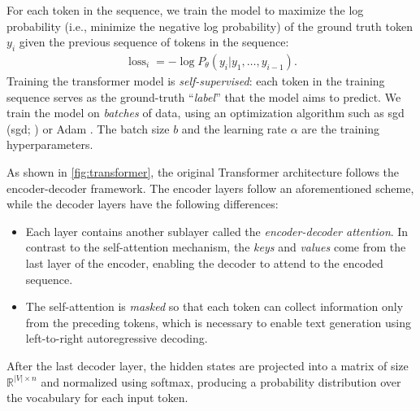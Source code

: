 For each token in the sequence, we train the model to maximize the log probability (i.e., minimize the negative log probability) of the ground truth token $y_i$ given the previous sequence of tokens in the sequence:
\begin{align}
    \operatorname{loss}_i = -\log P_\theta(y_i|y_1, \hdots, y_{i-1}).
\end{align}
Training the transformer model is \emph{self-supervised}: each token in the training sequence serves as the ground-truth ``\emph{label}'' that the model aims to predict. We train the model on \emph{batches} of data, using an optimization algorithm such as \acl{sgd} (\acs{sgd}; \citealp[p.~275]{goodfellow2016deep}) or Adam \cite{kingma2014adam}. The batch size $b$ and the learning rate $\alpha$ are the training hyperparameters.

As shown in \autoref{fig:transformer}, the original Transformer architecture follows the encoder-decoder framework. The encoder layers follow an aforementioned scheme, while the decoder layers have the following differences:
\begin{itemize}
    \item Each layer contains another sublayer called the \emph{encoder-decoder attention}. In contrast to the self-attention mechanism, the \emph{keys} and \emph{values} come from the last layer of the encoder, enabling the decoder to attend to the encoded sequence.
    \item The self-attention is \emph{masked} so that each token can collect information only from the preceding tokens, which is necessary to enable text generation using left-to-right autoregressive decoding.
\end{itemize}
After the last decoder layer, the hidden states are projected into a matrix of size $\mathbb{R}^{|V|\times n}$ and normalized using softmax, producing a probability distribution over the vocabulary for each input token.


